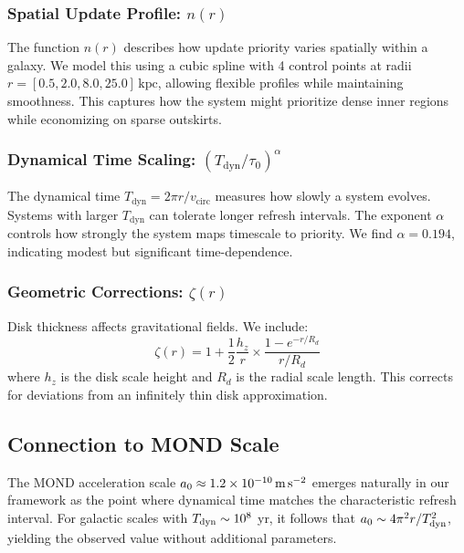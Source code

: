 \documentclass[twocolumn,prd,amsmath,amssymb,aps,superscriptaddress,nofootinbib]{revtex4-2}
\newcommand{\kpc}{\text{kpc}}
\newcommand{\azero}{a_0}
\begin{document}
\subsubsection{Spatial Update Profile: $n(r)$}

The function $n(r)$ describes how update priority varies spatially within a galaxy. We model this using a cubic spline with 4 control points at radii $r = [0.5, 2.0, 8.0, 25.0]\,\kpc$, allowing flexible profiles while maintaining smoothness. This captures how the system might prioritize dense inner regions while economizing on sparse outskirts.

\subsubsection{Dynamical Time Scaling: $(T_{\text{dyn}}/\tau_0)^\alpha$}

The dynamical time $T_{\text{dyn}} = 2\pi r/v_{\text{circ}}$ measures how slowly a system evolves. Systems with larger $T_{\text{dyn}}$ can tolerate longer refresh intervals. The exponent $\alpha$ controls how strongly the system maps timescale to priority. We find $\alpha = 0.194$, indicating modest but significant time-dependence.

\subsubsection{Geometric Corrections: $\zeta(r)$}

Disk thickness affects gravitational fields. We include:
\begin{equation}
\zeta(r) = 1 + \frac{1}{2}\frac{h_z}{r} \times \frac{1 - e^{-r/R_d}}{r/R_d}
\label{eq:geometric}
\end{equation}
where $h_z$ is the disk scale height and $R_d$ is the radial scale length. This corrects for deviations from an infinitely thin disk approximation.

\subsection{Connection to MOND Scale}

The MOND acceleration scale $\azero \approx 1.2 \times 10^{-10}\,\text{m\,s}^{-2}$ emerges naturally in our framework as the point where dynamical time matches the characteristic refresh interval. For galactic scales with $T_{\rm dyn} \sim 10^8$ yr, it follows that $\azero \sim 4\pi^2 r / T_{\rm dyn}^2$, yielding the observed value without additional parameters.
\end{document}
